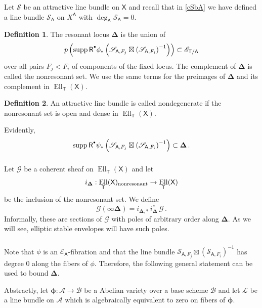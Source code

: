 \documentclass[14pt]{extarticle}
\newcommand{\Rd}{{\mathsf{R}}^{\raisebox{0.5mm}{$\scriptscriptstyle \bullet$}}}
\newcommand{\bT}{\mathsf{T}}
\newcommand{\bA}{\mathsf{A}}
\newcommand{\bX}{\mathsf{X}}
\newcommand{\cL}{\mathscr{L}}
\newcommand{\cG}{\mathscr{G}}
\newcommand{\cE}{\mathscr{E}}
\newcommand{\cA}{\mathscr{A}}
\newcommand{\cB}{\mathscr{B}}
\newcommand{\bDel}{\boldsymbol{\Delta}}
\newcommand{\bphi}{\boldsymbol{\phi}}
\newcommand{\cS}{\mathscr{S}}
\DeclareMathOperator{\Ell}{Ell}
\DeclareMathOperator{\supp}{supp}
\theoremstyle{definition}
\newtheorem{Definition}{Definition}
\begin{document}
\subsubsection{}
Let $\cS$ be an attractive line bundle on $\bX$ and recall that in
\eqref{cSbA} we have defined a line bundle $\cS_\bA$ on $X^\bA$ with
$\deg_\bA \cS_\bA = 0$. 

\begin{Definition}
  The resonant locus $\bDel$ is the union of
  $$
  p \left(\supp \Rd \phi_*  \left(\cS_{\bA,F_j} \boxtimes \left(
      \cS_{\bA,F_i} \right)^{-1}  \right) \right) \subset \cE_{\bT/\bA}
  $$
  over all pairs $F_j < F_i$  of components of the fixed locus. The
  complement of $\bDel$ is called the nonresonant set. We use the same
  terms for the preimages of $\bDel$ and its complement in
  $\Ell_\bT(\bX)$. 
\end{Definition}

\begin{Definition}
  An attractive line bundle is called nondegenerate if the nonresonant
  set is open and dense in $\Ell_\bT(\bX)$. 
\end{Definition}

\noindent 
Evidently,
$$
\supp \Rd \psi_*  \left(\cS_{\bA,F_j} \boxtimes \left(
    \cS_{\bA,F_i} \right)^{-1}  \right)  \subset \bDel \,.
$$


\subsubsection{}
Let $\cG$ be a coherent sheaf on $\Ell_\bT(\bX)$ and let
  $$
  i_{\bDel} : \Ell_\bT(\bX)_{\textup{nonresonant}} \to \Ell_\bT(\bX)
  $$
  be the inclusion of the nonresonant set. We define
  $$
  \cG(\infty \bDel) =  i_{\bDel,*} \,  i_{\bDel}^* \, \cG \,.
  $$
  Informally, these are sections of $\cG$ with poles of arbitrary
  order along $\bDel$. 
As we will see, elliptic stable envelopes will have such poles. 





\subsubsection{}
Note that $\phi$ is an $\cE_\bA$-fibration and that the line bundle 
  $\cS_{\bA,F_j} \boxtimes \left(
      \cS_{\bA,F_i} \right)^{-1}$  has degree $0$ along the fibers of $\phi$. Therefore, the
following general statement can be used to bound $\bDel$. 

 
Abstractly, let $\bphi: \cA \to \cB$ be a Abelian variety over a base
scheme $\cB$ and let $\cL$ be a line bundle on $\cA$ which is algebraically
equivalent to zero on fibers of $\bphi$. 
\end{document}
